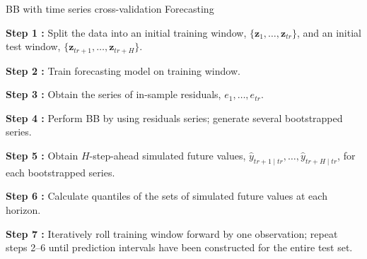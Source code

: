\documentclass[
  12pt,
  ignorenonframetext,
  aspectratio=169,
]{beamer}
\begin{document}
\begin{frame}{BB with time series cross-validation Forecasting}
\label{bb-with-time-series-cross-validation-forecasting}
\begin{block}{}
\fontsize{9}{9}\sf
\color{blue} \textbf{Step 1 :} \color{black} Split the data into an initial training window, $\{\bm{z}_{1}, \dots, \bm{z}_{tr}\}$, and an initial test window, $\{\bm{z}_{tr + 1}, \dots, \bm{z}_{tr + H}\}$.
\end{block}

\begin{block}{}
\fontsize{9}{9}\sf
\color{violet} \textbf{Step 2 :} \color{black} Train forecasting model on training window.
\end{block}

\begin{block}{}
\fontsize{9}{9}\sf
\color{blue} \textbf{Step 3 :} \color{black} Obtain the series of in-sample residuals, $e_{1}, \dots, e_{tr}$.
\end{block}

\begin{block}{}
\fontsize{9}{9}\sf
\color{violet} \textbf{Step 4 :} \color{black} Perform BB by using residuals series; generate several bootstrapped series.
\end{block}

\begin{block}{}
\fontsize{9}{9}\sf
\color{blue} \textbf{Step 5 :} \color{black} Obtain $H$-step-ahead simulated future values, $\hat{y}_{tr + 1 \mid tr}, \dots, \hat{y}_{tr + H \mid tr}$, for each bootstrapped series.
\end{block}

\begin{block}{}
\fontsize{9}{9}\sf
\color{violet} \textbf{Step 6 :} \color{black} Calculate quantiles of the sets of simulated future values at each horizon.
\end{block}

\begin{block}{}
\fontsize{9}{9}\sf
\color{blue} \textbf{Step 7 :} \color{black} Iteratively roll training window forward by one observation; repeat steps 2--6 until prediction intervals have been constructed for the entire test set.
\end{block}
\end{frame}
\end{document}

